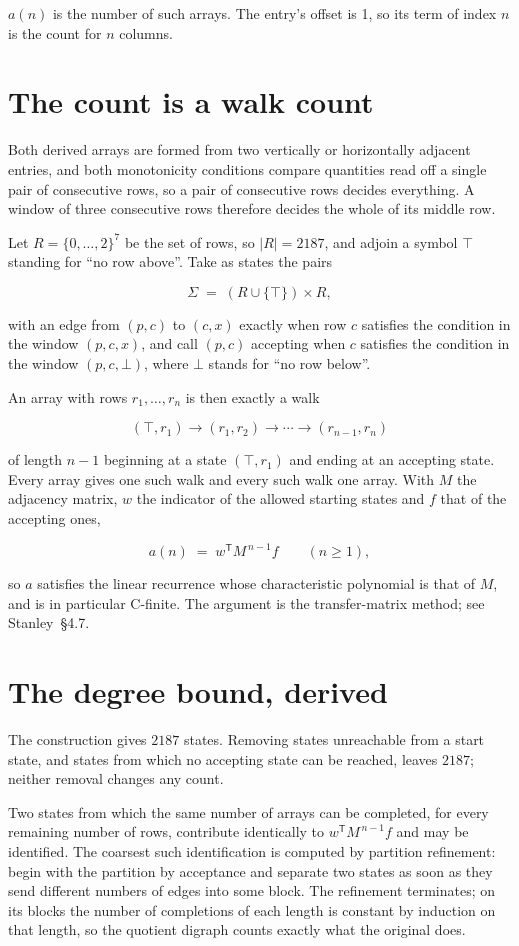 \documentclass[11pt]{article}
\theoremstyle{definition}
\begin{document}
$a(n)$ is the number of such arrays. The entry's offset is 1, so its term of index $n$ is the count for $n$ columns.

\section{The count is a walk count}

Both derived arrays are formed from two vertically or horizontally adjacent entries, and both monotonicity conditions compare quantities read off a single pair of consecutive rows, so a pair of consecutive rows decides everything. A window of three consecutive rows therefore decides the whole of its middle row.

Let $R = \{0,\dots,2\}^{7}$ be the set of rows, so $|R| = 2187$, and adjoin a symbol $\top$ standing for ``no row above''. Take as states the pairs

\[\Sigma \;=\; (R \cup \{\top\}) \times R,\]

with an edge from $(p,c)$ to $(c,x)$ exactly when row $c$ satisfies the condition in the window $(p,c,x)$, and call $(p,c)$ accepting when $c$ satisfies the condition in the window $(p,c,\bot)$, where $\bot$ stands for ``no row below''.

An array with rows $r_1,\dots,r_n$ is then exactly a walk

\[(\top,r_1) \to (r_1,r_2) \to \cdots \to (r_{n-1},r_n)\]

of length $n-1$ beginning at a state $(\top,r_1)$ and ending at an accepting state. Every array gives one such walk and every such walk one array. With $M$ the adjacency matrix, $w$ the indicator of the allowed starting states and $f$ that of the accepting ones,

\[a(n) \;=\; w^{\mathsf T} M^{\,n-1} f \qquad (n \ge 1),\]

so $a$ satisfies the linear recurrence whose characteristic polynomial is that of $M$, and is in particular C-finite. The argument is the transfer-matrix method; see Stanley~\S4.7.

\section{The degree bound, derived}

The construction gives $2187$ states. Removing states unreachable from a start state, and states from which no accepting state can be reached, leaves $2187$; neither removal changes any count.

Two states from which the same number of arrays can be completed, for every remaining number of rows, contribute identically to $w^{\mathsf T}M^{\,n-1}f$ and may be identified. The coarsest such identification is computed by partition refinement: begin with the partition by acceptance and separate two states as soon as they send different numbers of edges into some block. The refinement terminates; on its blocks the number of completions of each length is constant by induction on that length, so the quotient digraph counts exactly what the original does.
\end{document}
